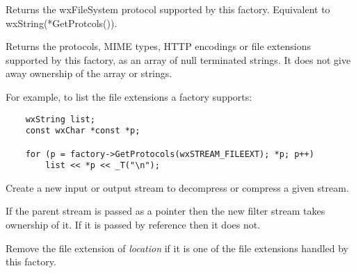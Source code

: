 
Returns the wxFileSystem protocol supported by this factory. Equivalent
to wxString(*GetProtcols()).


\label{wxfilterclassfactorygetprotocols}


Returns the protocols, MIME types, HTTP encodings or file extensions
supported by this factory, as an array of null terminated strings. It does
not give away ownership of the array or strings.

For example, to list the file extensions a factory supports:

\begin{verbatim}
    wxString list;
    const wxChar *const *p;

    for (p = factory->GetProtocols(wxSTREAM_FILEEXT); *p; p++)
        list << *p << _T("\n");

\end{verbatim}


\label{wxfilterclassfactorynewstream}





Create a new input or output stream to decompress or compress a given stream.

If the parent stream is passed as a pointer then the new filter stream
takes ownership of it. If it is passed by reference then it does not.


\label{wxfilterclassfactorypopextension}


Remove the file extension of {\it location} if it is one of the file
extensions handled by this factory.


\label{wxfilterclassfactorypushfront}

